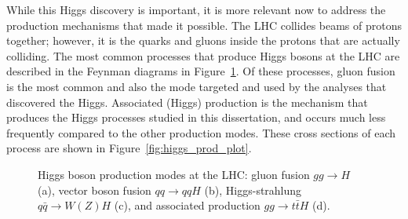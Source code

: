 While this Higgs discovery is important, it is more relevant now to address the production mechanisms that made it possible. The LHC collides beams of protons together;
however, it is the quarks and gluons inside the protons that are actually colliding. The most common processes that produce Higgs bosons at the LHC are described in the
Feynman diagrams in Figure~\ref{fig:higgs_production}. Of these processes, gluon fusion is the most common and also the mode targeted and used by the analyses that
discovered the Higgs. Associated (Higgs) production is the mechanism that produces the Higgs processes studied in this dissertation, and occurs much less frequently compared to
the other production modes. These cross sections of each process are shown in Figure~\ref{fig:higgs_prod_plot}.


\begin{figure}[htbp] 
  {\centering
    \caption[Higgs boson production modes at the LHC]{Higgs boson production modes at the LHC:
      gluon fusion $gg\to{}H$ (a), vector boson fusion $qq\to{}qqH$ (b),
      Higgs-strahlung $q\bar{q}\to{}W(Z)H$ (c), and associated
      production $gg\to{}t\bar{t}H$ (d).}
    \label{fig:higgs_production}}
\end{figure}

